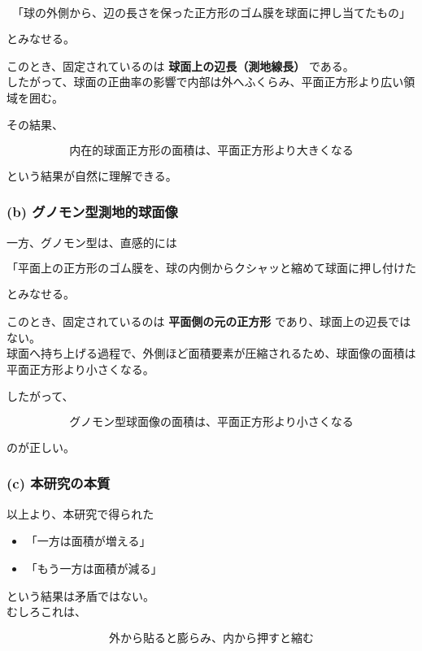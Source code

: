 \documentclass[
  12pt,
  a4paper,
]{article}
\providecommand{\tightlist}{%
  \setlength{\itemsep}{0pt}\setlength{\parskip}{0pt}}
\begin{document}
\[
\boxed{
\text{「球の外側から、辺の長さを保った正方形のゴム膜を球面に押し当てたもの」}
}
\]

とみなせる。

このとき、固定されているのは \textbf{球面上の辺長（測地線長）}
である。\\
したがって、球面の正曲率の影響で内部は外へふくらみ、平面正方形より広い領域を囲む。

その結果、

\[
\boxed{
\text{内在的球面正方形の面積は、平面正方形より大きくなる}
}
\]

という結果が自然に理解できる。

\subsubsection{(b)
グノモン型測地的球面像}\label{b-ux30b0ux30ceux30e2ux30f3ux578bux6e2cux5730ux7684ux7403ux9762ux50cf}

一方、グノモン型は、直感的には

\[
\boxed{
\text{「平面上の正方形のゴム膜を、球の内側からクシャッと縮めて球面に押し付けたもの」}
}
\]

とみなせる。

このとき、固定されているのは \textbf{平面側の元の正方形}
であり、球面上の辺長ではない。\\
球面へ持ち上げる過程で、外側ほど面積要素が圧縮されるため、球面像の面積は平面正方形より小さくなる。

したがって、

\[
\boxed{
\text{グノモン型球面像の面積は、平面正方形より小さくなる}
}
\]

のが正しい。

\subsubsection{(c)
本研究の本質}\label{c-ux672cux7814ux7a76ux306eux672cux8cea}

以上より、本研究で得られた

\begin{itemize}
\tightlist
\item
  「一方は面積が増える」
\item
  「もう一方は面積が減る」
\end{itemize}

という結果は矛盾ではない。\\
むしろこれは、

\[
\boxed{
\text{外から貼ると膨らみ、内から押すと縮む}
}
\]
\end{document}
